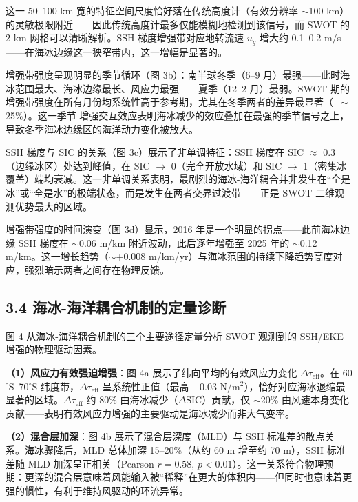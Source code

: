 \documentclass[11pt,a4paper]{article}
\begin{document}
这一 50--100 km 宽的特征空间尺度恰好落在传统高度计（有效分辨率 $\sim$100 km）的灵敏极限附近——因此传统高度计最多仅能模糊地检测到该信号，而 SWOT 的 2 km 网格可以清晰解析。SSH 梯度增强带对应地转流速 $u_g$ 增大约 0.1--0.2 m/s——在海冰边缘这一狭窄带内，这一增幅是显著的。\par

增强带强度呈现明显的季节循环（图 3b）：南半球冬季（6--9 月）最强——此时海冰范围最大、海冰边缘最长、风应力最强——夏季（12--2 月）最弱。SWOT 期的增强带强度在所有月份均系统性高于参考期，尤其在冬季两者的差异最显著（+$\sim$25\%）。这一季节-增强交互效应表明海冰减少的效应叠加在最强的季节信号之上，导致冬季海冰边缘区的海洋动力变化被放大。\par

SSH 梯度与 SIC 的关系（图 3c）展示了非单调特征：SSH 梯度在 SIC $\approx$ 0.3（边缘冰区）处达到峰值，在 SIC $\to$ 0（完全开放水域）和 SIC $\to$ 1（密集冰覆盖）端均衰减。这一非单调关系表明，最剧烈的海冰-海洋耦合并非发生在``全是冰''或``全是水''的极端状态，而是发生在两者交界过渡带——正是 SWOT 二维观测优势最大的区域。\par

增强带强度的时间演变（图 3d）显示，2016 年是一个明显的拐点——此前海冰边缘 SSH 梯度在 $\sim$0.06 m/km 附近波动，此后逐年增强至 2025 年的 $\sim$0.12 m/km。这一增长趋势（$\sim$+0.008 m/km/yr）与海冰范围的持续下降趋势高度对应，强烈暗示两者之间存在物理反馈。\par

\subsection*{3.4  海冰-海洋耦合机制的定量诊断}

图 4 从海冰-海洋耦合机制的三个主要途径定量分析 SWOT 观测到的 SSH/EKE 增强的物理驱动因素。

\textbf{（1）风应力有效强迫增强}：图 4a 展示了纬向平均的有效风应力变化 $\Delta\tau_{\text{eff}}$。在 60$^\circ$S--70$^\circ$S 纬度带，$\Delta\tau_{\text{eff}}$ 呈系统性正值（最高 +0.03 N/m$^2$），恰好对应海冰退缩最显著的区域。$\Delta\tau_{\text{eff}}$ 约 80\% 由海冰减少（$\Delta$SIC）贡献，仅 $\sim$20\% 由风速本身变化贡献——表明有效风应力增强的主要驱动是海冰减少而非大气变率。\par

\textbf{（2）混合层加深}：图 4b 展示了混合层深度（MLD）与 SSH 标准差的散点关系。海冰骤降后，MLD 总体加深 15--20\%（从约 60 m 增至约 70 m），SSH 标准差随 MLD 加深呈正相关（Pearson $r = 0.58$, $p < 0.01$）。这一关系符合物理预期：更深的混合层意味着风能输入被``稀释''在更大的体积内——但同时也意味着更强的惯性，有利于维持风驱动的环流异常。\par
\end{document}
